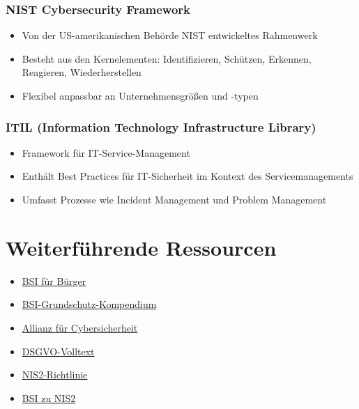 \documentclass{orgstandard}
\begin{document}
\subsubsection{NIST Cybersecurity Framework}
\label{sec:org83ee369}
\begin{itemize}
\item Von der US-amerikanischen Behörde NIST entwickeltes Rahmenwerk
\item Besteht aus den Kernelementen: Identifizieren, Schützen, Erkennen, Reagieren, Wiederherstellen
\item Flexibel anpassbar an Unternehmensgrößen und -typen
\end{itemize}
\subsubsection{ITIL (Information Technology Infrastructure Library)}
\label{sec:orge1bdf43}
\begin{itemize}
\item Framework für IT-Service-Management
\item Enthält Best Practices für IT-Sicherheit im Kontext des Servicemanagements
\item Umfasst Prozesse wie Incident Management und Problem Management
\end{itemize}
\section{Weiterführende Ressourcen}
\label{sec:org3419a31}
\begin{itemize}
\item \href{https://www.bsi-fuer-buerger.de}{BSI für Bürger}
\item \href{https://www.bsi.bund.de/DE/Themen/Unternehmen-und-Organisationen/Standards-und-Zertifizierung/IT-Grundschutz/IT-Grundschutz-Kompendium/it-grundschutz-kompendium\_node.html}{BSI-Grundschutz-Kompendium}
\item \href{https://www.allianz-fuer-cybersicherheit.de}{Allianz für Cybersicherheit}
\item \href{https://dsgvo-gesetz.de}{DSGVO-Volltext}
\item \href{https://eur-lex.europa.eu/legal-content/DE/TXT/HTML/?uri=CELEX:32022L2555}{NIS2-Richtlinie}
\item \href{https://www.bsi.bund.de/DE/Themen/Regulierte-Wirtschaft/NIS-2-regulierte-Unternehmen/nis-2-regulierte-unternehmen\_node.html}{BSI zu NIS2}
\end{itemize}
\end{document}
